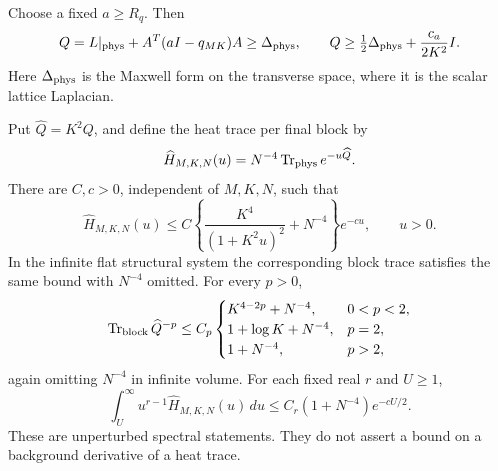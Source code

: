 Choose a fixed \(a\ge R_q\). Then
\begin{equation}
 Q=L|_{\rm phys}+A^T(aI-q_{MK})A\ge\Delta_{\rm phys},
 \qquad
 Q\ge\tfrac12\Delta_{\rm phys}+\frac{c_a}{2K^2}I .
 \label{pvs-combined-order}
\end{equation}
Here \(\Delta_{\rm phys}\) is the Maxwell form on the transverse
space, where it is the scalar lattice Laplacian.

\begin{theorem}
\label{pvs-main}
Put \(\widehat Q=K^2Q\), and define the heat trace per final block by
\[
 \widehat H_{M,K,N}(u)
   =N^{-4}\operatorname{Tr}_{\rm phys}e^{-u\widehat Q}.
\]
There are \(C,c>0\), independent of \(M,K,N\), such that
\begin{equation}
 \widehat H_{M,K,N}(u)
 \le C\left\{\frac{K^4}{(1+K^2u)^2}+N^{-4}\right\}e^{-cu},
 \qquad u>0.
 \label{pvs-heat}
\end{equation}
In the infinite flat structural system the corresponding block
trace satisfies the same bound with \(N^{-4}\) omitted.
For every \(p>0\),
\begin{equation}
 \operatorname{Tr}_{\rm block}\widehat Q^{-p}
 \le C_p
 \begin{cases}
 K^{4-2p}+N^{-4},&0<p<2,\\
 1+\log K+N^{-4},&p=2,\\
 1+N^{-4},&p>2,
 \end{cases}
 \label{pvs-moments}
\end{equation}
again omitting \(N^{-4}\) in infinite volume.
For each fixed real \(r\) and \(U\ge1\),
\begin{equation}
 \int_U^\infty u^{r-1}\widehat H_{M,K,N}(u)\,du
 \le C_r(1+N^{-4})e^{-cU/2}.
 \label{pvs-tail}
\end{equation}
These are unperturbed spectral statements. They do not assert a
bound on a background derivative of a heat trace.
\end{theorem}

